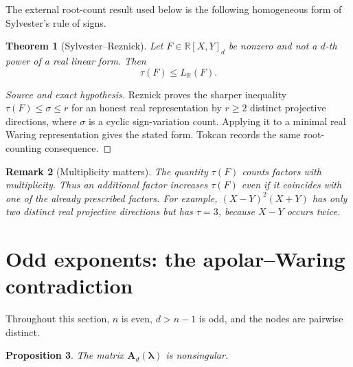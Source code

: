 \documentclass[11pt,letterpaper,reqno]{amsart}
\numberwithin{equation}{section}
\newtheorem{theorem}{Theorem}[section]
\newtheorem{proposition}[theorem]{Proposition}
\newtheorem{remark}[theorem]{Remark}
\theoremstyle{definition}
\newcommand{\RR}{\mathbb{R}}
\newcommand{\LR}{L_{\RR}}
\newcommand{\Mat}[1]{\mathbf{#1}}
\newcommand{\vct}[1]{\boldsymbol{#1}}
\begin{document}
The external root-count result used below is the following homogeneous
form of Sylvester's rule of signs.

\begin{theorem}[Sylvester--Reznick]\label{thm:reznick}
Let \(F\in\RR[X,Y]_d\) be nonzero and not a \(d\)-th power of a real
linear form.  Then
\[
 \tau(F)\le \LR(F).
\]
\end{theorem}

\begin{proof}[Source and exact hypothesis]
Reznick \cite[Theorem~3.2]{Reznick2013} proves the sharper inequality
\(\tau(F)\le\sigma\le r\) for an honest real representation by
\(r\ge2\) distinct projective directions, where \(\sigma\) is a cyclic
sign-variation count.  Applying it to a minimal real Waring
representation gives the stated form.  Tokcan
\cite[Introduction, pp.~1--2]{Tokcan2017} records the same root-counting
consequence.
\end{proof}

\begin{remark}[Multiplicity matters]\label{rem:multiplicity}
The quantity \(\tau(F)\) counts factors with multiplicity.  Thus an
additional factor increases \(\tau(F)\) even if it coincides with one of
the already prescribed factors.  For example,
\((X-Y)^2(X+Y)\) has only two distinct real projective directions but
has \(\tau=3\), because \(X-Y\) occurs twice.
\end{remark}

\section{Odd exponents: the apolar--Waring contradiction}
\label{sec:odd}

Throughout this section, \(n\) is even, \(d>n-1\) is odd, and the nodes
are pairwise distinct.

\begin{proposition}\label{prop:odd-nonsingular}
The matrix \(\Mat{A}_d(\vct{\lambda})\) is nonsingular.
\end{proposition}
\end{document}
